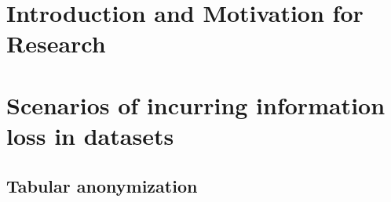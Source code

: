 \documentclass{llncs}
\begin{document}
\renewcommand{\thesubfigure}{\thefigure.\arabic{subfigure}}
\makeatletter
\renewcommand{\p@subfigure}{}
\renewcommand{\@thesubfigure}{\thesubfigure:\hskip\subfiglabelskip}
\makeatother


\section{Introduction and Motivation for Research}



\section{Scenarios of incurring information loss in datasets}



\subsection{Tabular anonymization}
\label{ssect:tab_anonym}

\end{document}
